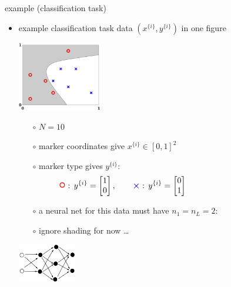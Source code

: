 \documentclass[xcolor={svgnames},
               hyperref={colorlinks,citecolor=DeepPink4,linkcolor=FireBrick,urlcolor=Maroon}]
               {beamer}
\begin{document}
\begin{frame}{example (classification task)}

\begin{itemize}
\item example \alert{classification task} data $(x^{\{i\}},y^{\{i\}})$ in one figure

\begin{center}
\includegraphics[height=30mm]{figs/classification}
\end{center}
    \begin{itemize}
    \item[$\circ$] $N=10$
    \item[$\circ$] marker coordinates give $x^{\{i\}} \in [0,1]^2$
    \item[$\circ$] marker type gives $y^{\{i\}}$:
   $$\text{\Large {\color{red} $\bm{\circ}$}}:\, y^{\{i\}} = \begin{bmatrix} 1 \\ 0 \end{bmatrix}, \qquad {\color{blue} \bm{\times}}:\, y^{\{i\}} = \begin{bmatrix} 0 \\ 1 \end{bmatrix} \phantom{ldsfj adflkj sadfkj adfsk}$$
    \item[$\circ$] a neural net for this data must have $n_1=n_L=2$:
    \item[$\circ$] ignore shading for now \dots
    \end{itemize}

\vspace{-15mm}
\hfill \includegraphics[width=0.2\textwidth]{figs/cleannet}
\end{itemize}
\end{frame}
\end{document}
